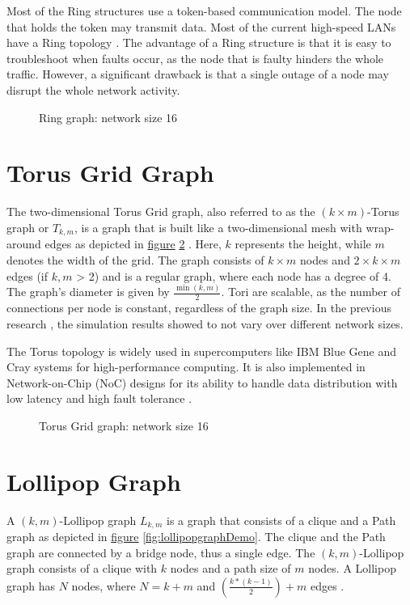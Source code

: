 Most of the Ring structures use a token-based communication model. The node that holds the token may transmit data. Most of the current high-speed LANs have a Ring topology \cite{Vidomenko1997}. The advantage of a Ring structure is that it is easy to troubleshoot when faults occur, as the node that is faulty hinders the whole traffic. However, a significant drawback is that a single outage of a node may disrupt the whole network activity.

\begin{figure}[H]
    \centering
    \scalebox{0.8}{}
    \caption{Ring graph: network size 16}
    \label{fig:ring}
\end{figure}

\section{Torus Grid Graph}\label{sec:2torusgridgraph}
The two-dimensional Torus Grid graph, also referred to as the $(k \times m)$-Torus graph or $T_{k,m}$, is a graph that is built like a two-dimensional mesh with wrap-around edges as depicted in \hyperref[fig:torusGraph]{figure} \ref{fig:torusGraph} \cite{Mahlmann2010}. Here, $k$ represents the height, while $m$ denotes the width of the grid. The graph consists of $k \times m$ nodes and $2\times k \times m$ edges (if $k, m$ > 2) and is a regular graph, where each node has a degree of 4. The graph's diameter is given by $\frac{\min(k,m)}{2}$. Tori are scalable, as the number of connections per node is constant, regardless of the graph size. In the previous research \cite{Bayazitoglu}, the simulation results showed to not vary over different network sizes.

The Torus topology is widely used in supercomputers like IBM Blue Gene and Cray systems for high-performance computing. It is also implemented in Network-on-Chip (NoC) designs for its ability to handle data distribution with low latency and high fault tolerance \cite{Banerjee2001}.

\begin{figure}[H]
    \centering
    \scalebox{1.5}{}
    \caption{Torus Grid graph: network size 16}
    \label{fig:torusGraph}
\end{figure}

\section{Lollipop Graph}\label{sec:2lollipopgraph}
A $(k, m)$-Lollipop graph $L_{k,m}$ is a graph that consists of a clique and a Path graph as depicted in \hyperref[fig:lollipopgraphDemo]{figure} \ref{fig:lollipopgraphDemo}. The clique and the Path graph are connected by a bridge node, thus a single edge. The $(k, m)$-Lollipop graph consists of a clique with $k$ nodes and a path size of $m$ nodes. A Lollipop graph has $N$ nodes, where $N = k+m$ and $(\frac{k*(k-1)}{2})+m$ edges \cite{JonassonLollipopGraphs2000}.

